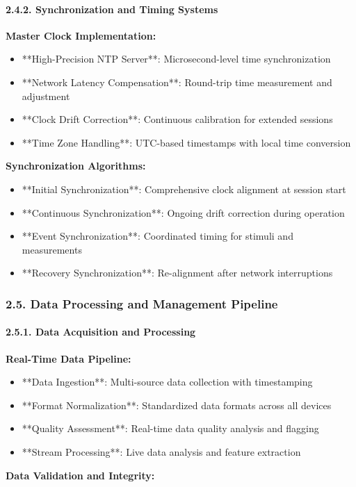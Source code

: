 \documentclass[12pt,a4paper]{article}
\begin{document}
\paragraph{2.4.2. Synchronization and Timing Systems}

\textbf{Master Clock Implementation:}

\begin{itemize}
\item **High-Precision NTP Server**: Microsecond-level time synchronization
\item **Network Latency Compensation**: Round-trip time measurement and adjustment
\item **Clock Drift Correction**: Continuous calibration for extended sessions
\item **Time Zone Handling**: UTC-based timestamps with local time conversion

\end{itemize}
\textbf{Synchronization Algorithms:}

\begin{itemize}
\item **Initial Synchronization**: Comprehensive clock alignment at session start
\item **Continuous Synchronization**: Ongoing drift correction during operation
\item **Event Synchronization**: Coordinated timing for stimuli and measurements
\item **Recovery Synchronization**: Re-alignment after network interruptions

\end{itemize}
\subsubsection{2.5. Data Processing and Management Pipeline}

\paragraph{2.5.1. Data Acquisition and Processing}

\textbf{Real-Time Data Pipeline:}

\begin{itemize}
\item **Data Ingestion**: Multi-source data collection with timestamping
\item **Format Normalization**: Standardized data formats across all devices
\item **Quality Assessment**: Real-time data quality analysis and flagging
\item **Stream Processing**: Live data analysis and feature extraction

\end{itemize}
\textbf{Data Validation and Integrity:}
\end{document}
